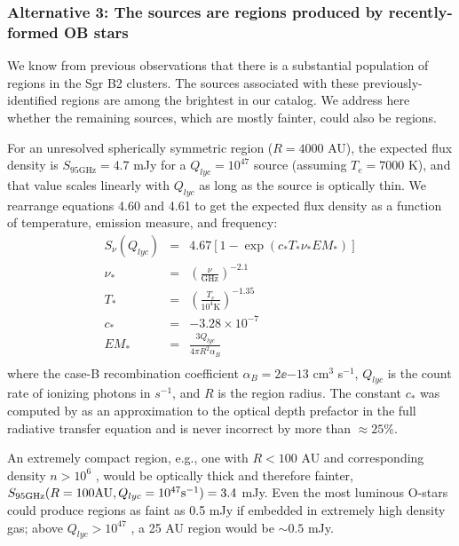 \documentclass[twocolumn]{aastex61}
\begin{document}
\subsubsection{Alternative 3: The sources are \hii regions produced by
recently-formed OB stars}
\label{sec:theyarehiiregions}

We know from previous observations
\citep[e.g.,][]{Mehringer1995b,De-Pree1996a,De-Pree2015a} that there is a
substantial population of \hii regions in the Sgr B2 clusters.  The \nhii
sources associated with these previously-identified \hii regions are among the
brightest in our catalog.  We address here whether the remaining  sources,
which are mostly fainter, could also be \hii regions.

For an unresolved spherically symmetric \hii region ($R=4000$ AU), the expected
flux density is $S_{95 \mathrm{GHz}} = 4.7$ mJy for a $Q_{lyc}=10^{47}$ \pers
source (assuming $T_e=7000$ K), and that value scales linearly with $Q_{lyc}$
as long as the source is optically thin.   We rearrange \citet{Condon2007a}
equations 4.60 and 4.61 to get the expected flux density as a function of
temperature, emission measure, and frequency:
\begin{eqnarray}
S_{\nu}(Q_{lyc})  &=& 4.67 \left[1-\exp\left(c_* T_* \nu_* EM_* \right) \right] \nonumber \\
\nu_* &=& \left(\frac{\nu}{\mathrm{GHz}}\right)^{-2.1} \nonumber \\
T_* &=& \left(\frac{T_e}{10^4 \mathrm{K}}\right)^{-1.35} \nonumber \\
c_* &=& -3.28\times10^{-7} \nonumber \\
EM_* &=& \frac{3 Q_{lyc}}{4 \pi R^2 \alpha_B} \nonumber \\
\end{eqnarray}
where the case-B recombination coefficient $\alpha_B=2\ee{-13}$ cm$^3$
s$^{-1}$, $Q_{lyc}$ is the count rate of ionizing photons in $s^{-1}$, and $R$
is the \hii region radius.  The constant $c_*$ was computed by
\citet{Mezger1967a} as an approximation to the optical depth prefactor in the
full radiative transfer equation and is never incorrect by more than
$\approx25\%$.

An extremely compact \hii region,
e.g., one with $R<100$ AU and corresponding density $n>10^6$ \percc, would be
optically thick and therefore fainter, $S_{95 \mathrm{GHz}}(R=100 \mathrm{AU},
Q_{lyc}=10^{47} \mathrm{s}^{-1})=3.4$ mJy.  Even the most luminous O-stars could produce \hii
regions as faint as 0.5 mJy if embedded in extremely high density gas; above
$Q_{lyc}>10^{47}$ \pers, a 25 AU \hii region would be $\sim0.5$ mJy.
\end{document}
